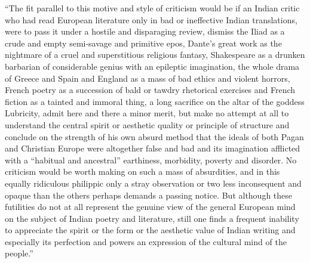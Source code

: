 \begin{myquote}
“The fit parallel to this motive and style of criticism would be if an Indian critic who had read European literature only in bad or ineffective Indian translations, were to pass it under a hostile and disparaging review, dismiss the Iliad as a crude and empty semi-savage and primitive epos, Dante’s great work as the nightmare of a cruel and superstitious religious fantasy, Shakespeare as a drunken barbarian of considerable genius with an epileptic imagination, the whole drama of Greece and Spain and England as a mass of bad ethics and violent horrors, French poetry as a succession of bald or tawdry rhetorical exercises and French fiction as a tainted and immoral thing, a long sacrifice on the altar of the goddess Lubricity, admit here and there a minor merit, but make no attempt at all to understand the central spirit or aesthetic quality or principle of structure and conclude on the strength of his own absurd method that the ideals of both Pagan and Christian Europe were altogether false and bad and its imagination afflicted with a “habitual and ancestral” earthiness, morbidity, poverty and disorder. No criticism would be worth making on such a mass of absurdities, and in this equally ridiculous philippic only a stray observation or two less inconsequent and opaque than the others perhaps demands a passing notice. But although these futilities do not at all represent the genuine view of the general European mind on the subject of Indian poetry and literature, still one finds a frequent inability to appreciate the spirit or the form or the aesthetic value of Indian writing and especially its perfection and powers an expression of the cultural mind of the people.”
\end{myquote}

